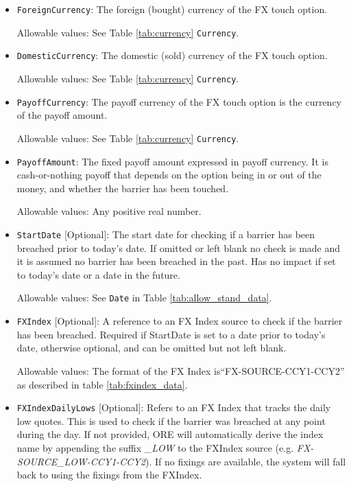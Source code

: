 \begin{itemize}
\item \lstinline!ForeignCurrency!: The foreign (bought) currency of the FX touch option.  

Allowable values:  See Table \ref{tab:currency} \lstinline!Currency!.

\item \lstinline!DomesticCurrency!: The domestic (sold) currency of the FX touch option.

Allowable values:  See Table \ref{tab:currency} \lstinline!Currency!.

\item \lstinline!PayoffCurrency!: The payoff currency of the FX touch option is the currency of the payoff amount. 

Allowable values:  See Table \ref{tab:currency} \lstinline!Currency!.

\item \lstinline!PayoffAmount!: The fixed payoff amount expressed in payoff currency. It is cash-or-nothing payoff that depends on the option being in or out of the money, and whether the barrier has been touched.

Allowable values:  Any positive real number.

\item \lstinline!StartDate! [Optional]: The start date for checking if a barrier has been breached prior to today's date.  If omitted or left blank no check is made and it is assumed no barrier has been breached in the past. Has no impact if set to today's date or a date in the future.

Allowable values:  See \lstinline!Date! in Table \ref{tab:allow_stand_data}.

\item \lstinline!FXIndex! [Optional]: A reference to an FX Index source to check if the barrier has been breached. Required if StartDate is set to a date prior to today's date, otherwise optional, and can be omitted but not left blank.

Allowable values: The format of the FX Index is``FX-SOURCE-CCY1-CCY2'' as described in table \ref{tab:fxindex_data}.  
\item \lstinline!FXIndexDailyLows! [Optional]: Refers to an FX Index that tracks the daily low quotes. This is used to check if the barrier was breached at any point during the day. If not provided, ORE will automatically derive the index name by appending the suffix \emph{\_LOW} to the FXIndex source (e.g. \emph{FX-SOURCE\_LOW-CCY1-CCY2}). If no fixings are available, the system will fall back to using the fixings from the FXIndex.


\end{itemize}

